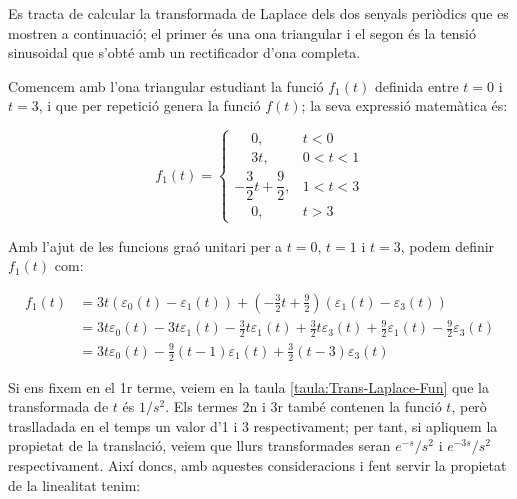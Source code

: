 	
\begin{exemple}[\CalcTransfLaplace{}]
	\addcontentsxms{\CalcTransfLaplace}
    Es tracta de calcular la transformada de Laplace dels dos
    senyals periòdics que es mostren a continuació; el primer és una
    ona triangular i el segon és la tensió sinusoidal que s'obté amb un
    rectificador d'ona completa.

    \begin{center}
        
    \end{center}

    Comencem amb l'ona triangular estudiant la funció $f_1(t)$ definida
    entre $t=0$ i $t=3$, i que per repetició genera la funció $f(t)$; la
    seva expressió matemàtica és:

    \[
        f_1(t) = \begin{cases}
        \phantom{-}0, & t < 0\\
        \phantom{-}3t, & 0<t<1 \\
        -\dfrac{3}{2}t +\dfrac{9}{2}, & 1 < t < 3 \\
        \phantom{-}0, & t > 3 \end{cases}
    \]

    Amb l'ajut de les funcions graó unitari per a $t=0$, $t=1$ i $t=3$,
    podem definir $f_1(t)$ com:

    \[\begin{split}
        f_1(t) &= 3t (\varepsilon_0(t) - \varepsilon_1(t)) + \left(-\frac{3}{2}t
        +\frac{9}{2}\right) (\varepsilon_1(t) -
        \varepsilon_3(t))  \\
        &=
        3t\varepsilon_0(t)-3t\varepsilon_1(t)-\frac{3}{2}t \varepsilon_1(t)
        +\frac{3}{2}t \varepsilon_3(t) +\frac{9}{2} \varepsilon_1(t)
        -\frac{9}{2} \varepsilon_3(t)  \\
        &=3t\varepsilon_0(t) -\frac{9}{2}(t-1)\varepsilon_1(t) +
        \frac{3}{2}(t-3)\varepsilon_3(t)
    \end{split}\]

    Si ens fixem en el 1r terme, veiem en la taula
    \vref{taula:Trans-Laplace-Fun} que la  transformada de $t$ és $1/s^2$.
    Els termes 2n i 3r també contenen la funció $t$, però traslladada
    en el temps un valor d'1 i 3 respectivament; per tant, si apliquem la propietat de la translació, veiem que llurs transformades
    seran $e^{-s}/s^2$  i $e^{-3s}/s^2$
    respectivament. Així doncs, amb aquestes consideracions i fent
    servir la propietat de la linealitat tenim:


\end{exemple}
